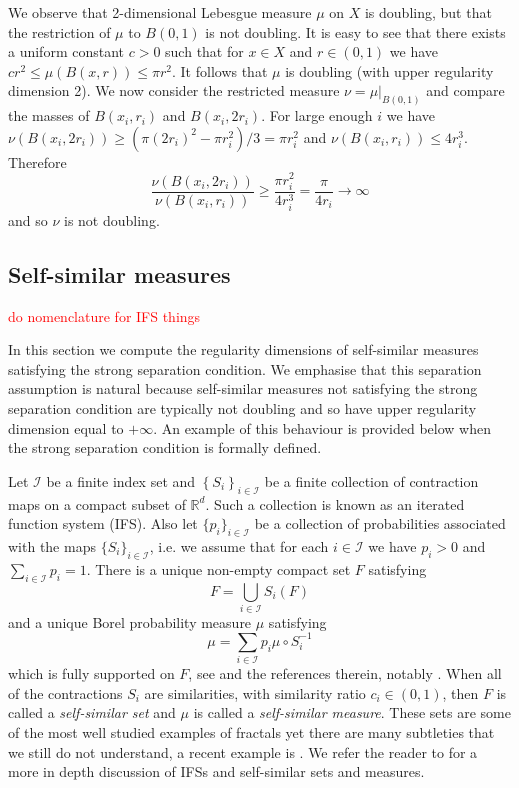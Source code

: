 We observe  that 2-dimensional Lebesgue measure $\mu$ on $X$ is doubling, but that the restriction of $\mu$ to $B(0,1)$ is not doubling.  It is easy to see that there exists a uniform constant $c>0$ such that for $x \in X$ and $r\in (0,1)$ we have $cr^2 \leq \mu(B(x,r)) \leq \pi r^2$.  It follows that $\mu$ is doubling (with upper regularity dimension 2).  We now consider the restricted measure $\nu = \mu \vert_{B(0,1)}$ and compare the masses of $B(x_i,r_i)$ and $B(x_i,2r_i)$. For large enough $i$ we have $\nu (B(x_i,2r_i)) \ge (\pi (2r_i)^2-\pi r_i^2)/3 = \pi r_i^2$  and $\nu (B(x_i,r_i)) \le 4 r_i^3$. Therefore
\[
\frac{\nu(B(x_i,2r_i))}{\nu(B(x_i,r_i))} \ge \frac{\pi r_i^2}{4r_i^3} =  \frac{\pi}{4r_i} \to \infty
\]
and so  $\nu$ is not doubling.


\subsection{Self-similar measures}\label{ch-upper-reg:sec:self-similarresult}

\textcolor{red}{do nomenclature for IFS things}

In this section we compute the regularity dimensions of self-similar measures satisfying the strong separation condition. We emphasise that this separation assumption is natural because self-similar measures not satisfying the strong separation condition are typically not doubling and so have upper regularity dimension equal to $+\infty$. An example of this behaviour is provided below when the strong separation condition is formally defined. 

Let  $\mathcal{I}$ be a finite index set and $\left\{S_i \right\}_{i \in \mathcal{I}}$ be a finite collection of  contraction maps on a compact subset of $\mathbb{R}^d$.  Such a collection is known as an iterated function system (IFS).  Also let $\{p_i\}_{i \in \mathcal{I}}$ be a collection of probabilities associated with the maps $\{S_i\}_{i \in \mathcal{I}}$, i.e. we assume that for each $i \in \mathcal{I}$ we have $p_i>0$ and $\sum_{i \in \mathcal{I}} p_i = 1$. There is a  unique non-empty compact set $F$ satisfying 
\[
F=\displaystyle\bigcup_{i\in \mathcal{I}} S_i(F)
\]
and  a unique Borel probability measure $\mu$ satisfying
\[
\mu = \sum_{i \in \mathcal{I}} p_i \mu \circ S_i^{-1}
\]
which is fully supported on $F$, see \cite[Chapter 9]{falconer} and the references therein, notably \cite{hutchinson}. When all of the contractions $S_i$ are similarities, with similarity ratio $c_i \in \left(0,1 \right)$, then $F$ is called a \emph{self-similar set} and $\mu$ is called a \emph{self-similar measure}. These sets are some of the most well studied examples of fractals yet there are many subtleties that we still do not understand, a recent example is \cite{baker}. We refer the reader to \cite{falconer} for a more in depth discussion of IFSs and self-similar sets and measures.

